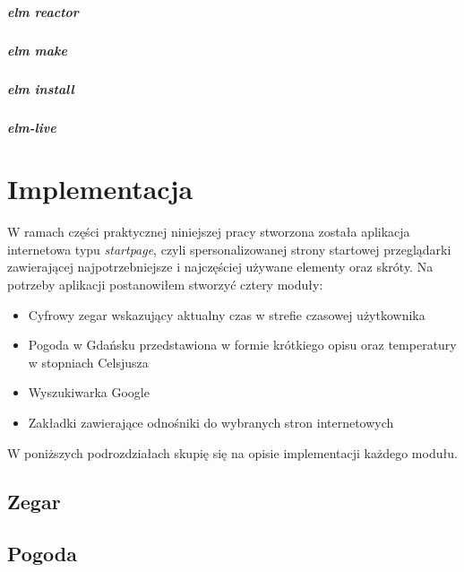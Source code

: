 \documentclass[twoside,a4paper]{report}
\begin{document}
\paragraph{elm reactor}

\paragraph{elm make}

\paragraph{elm install}

\paragraph{elm-live}
\cite{elm-live}



\chapter{Implementacja}
W ramach części praktycznej niniejszej pracy stworzona została aplikacja internetowa typu \textit{startpage}, czyli spersonalizowanej strony startowej przeglądarki zawierającej najpotrzebniejsze i najczęściej używane elementy oraz skróty. Na potrzeby aplikacji postanowiłem stworzyć cztery moduły:
\begin{itemize}
    \item Cyfrowy zegar wskazujący aktualny czas w strefie czasowej użytkownika
    \item Pogoda w Gdańsku przedstawiona w formie krótkiego opisu oraz temperatury w stopniach Celsjusza
    \item Wyszukiwarka Google
    \item Zakładki zawierające odnośniki do wybranych stron internetowych
\end{itemize}

W poniższych podrozdziałach skupię się na opisie implementacji każdego modułu.

\section{Zegar}

\section{Pogoda}
\end{document}
